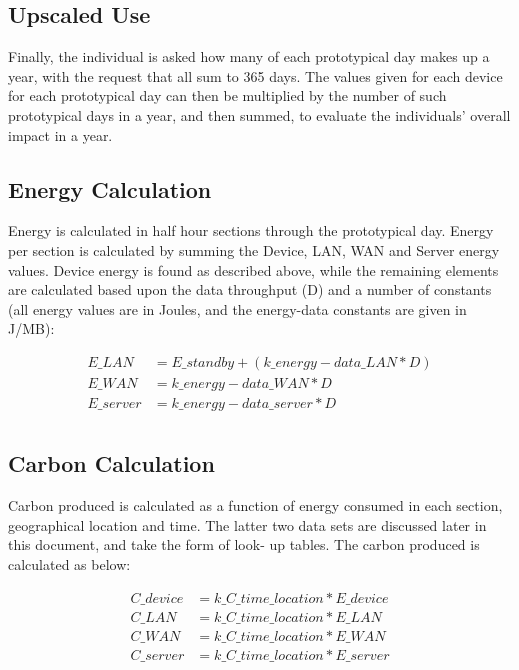 \documentclass[conference]{IEEEtran}
\begin{document}
\subsection{Upscaled Use}

Finally, the individual is asked how many of each prototypical day
makes up a year, with the request that all sum to 365 days. The values
given for each device for each prototypical day can then be multiplied
by the number of such prototypical days in a year, and then summed, to
evaluate the individuals' overall impact in a year.

\subsection{Energy Calculation}

Energy is calculated in half hour sections through the prototypical
day. Energy per section is calculated by summing the Device, LAN, WAN
and Server energy values. Device energy is found as described above,
while the remaining elements are calculated based upon the data
throughput (D) and a number of constants (all energy values are in
Joules, and the energy-data constants are given in J/MB):

\begin{align*}
   E\_LAN &= E\_standby + (k\_energy-data\_LAN * D)\\
  E\_WAN &= k\_energy-data\_WAN * D\\
E\_server &= k\_energy-data\_server * D\\
\end{align*}

\subsection{Carbon Calculation}

Carbon produced is calculated as a function of energy consumed in each
section, geographical location and time. The latter two data sets are
discussed later in this document, and take the form of look- up
tables. The carbon produced is calculated as below:

\begin{align*}
C\_device &= k\_C\_time\_location * E\_device\\
C\_LAN &= k\_C\_time\_location * E\_LAN\\
C\_WAN &= k\_C\_time\_location * E\_WAN\\
C\_server &= k\_C\_time\_location * E\_server\\
\end{align*}
\end{document}
